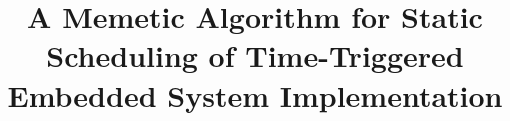 \documentclass[journal]{IEEEtran}
\theoremstyle{remark}
\begin{document}
%
\title{A Memetic Algorithm for Static Scheduling of Time-Triggered Embedded System Implementation}



\author{
}



%




% 
\end{document}
